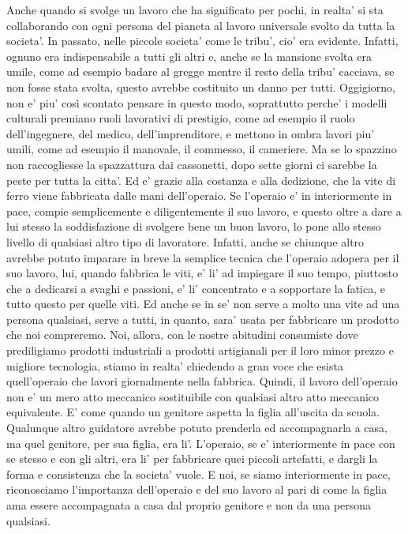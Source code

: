 Anche quando si svolge un lavoro che ha significato per pochi, in realta' si sta collaborando con ogni persona del pianeta al lavoro universale svolto da tutta la societa'. 
In passato, nelle piccole societa' come le tribu', cio' era evidente. Infatti, ognuno era indispensabile a tutti gli altri e, anche se la mansione svolta era umile, come ad esempio badare al gregge mentre il resto della tribu' cacciava,  se non fosse stata svolta, questo avrebbe costituito un danno per tutti.
Oggigiorno, non e' piu' così scontato pensare in questo modo, soprattutto perche' i modelli culturali premiano ruoli lavorativi di prestigio, come ad esempio il ruolo dell'ingegnere, del medico, dell'imprenditore, e mettono in ombra lavori piu' umili, come ad esempio il manovale, il commesso, il cameriere. 
Ma se lo spazzino non raccogliesse la spazzattura dai cassonetti, dopo sette giorni ci sarebbe la peste per tutta la citta'. Ed e' grazie alla costanza e alla dedizione, che la vite di ferro viene fabbricata dalle mani dell'operaio. Se l'operaio e' in interiormente in pace, compie semplicemente e diligentemente il suo lavoro, e questo oltre a dare a lui stesso la soddisfazione di svolgere bene un buon lavoro, lo pone allo stesso livello di qualsiasi altro tipo di lavoratore. 
Infatti, anche se chiunque altro avrebbe potuto imparare in breve la semplice tecnica che l'operaio adopera per il suo lavoro, lui, quando fabbrica le viti, e' li' ad impiegare il suo tempo, piuttosto che a dedicarsi a svaghi e passioni, e' li' concentrato e a sopportare la fatica, e tutto questo per quelle viti. 
Ed anche se in se' non serve a molto una vite ad una persona qualsiasi, serve a tutti, in quanto, sara' usata per fabbricare un prodotto che noi compreremo. 
Noi, allora, con le nostre abitudini consumiste dove prediligiamo prodotti industriali a prodotti artigianali per il loro minor prezzo e migliore tecnologia, stiamo in realta' chiedendo a gran voce che esista quell'operaio che lavori giornalmente nella fabbrica.
Quindi, il lavoro dell'operaio non e' un mero atto meccanico sostituibile con qualsiasi altro atto meccanico equivalente. E' come quando un genitore aspetta la figlia all'uscita da scuola. Qualunque altro guidatore avrebbe potuto prenderla ed accompagnarla a casa, ma quel genitore, per sua figlia, era li'. 
L'operaio, se e' interiormente in pace con se stesso e con gli altri, era li' per fabbricare quei piccoli artefatti, e dargli la forma e consistenza che la societa' vuole. E noi, se siamo interiormente in pace, riconosciamo l'importanza dell'operaio e del suo lavoro al pari di come la figlia ama essere accompagnata a casa dal proprio genitore e non da una persona qualsiasi.


